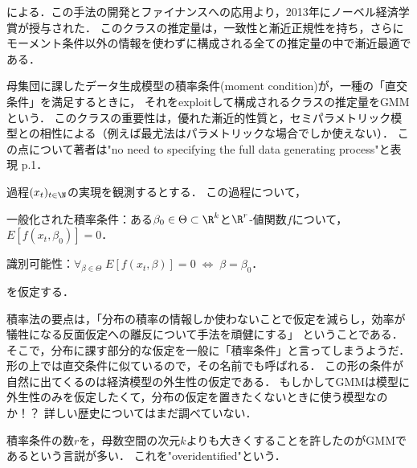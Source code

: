 \documentclass[uplatex,dvipdfmx]{jsreport}
\begin{document}
\begin{tcolorbox}[colframe=ForestGreen, colback=ForestGreen!10!white,breakable,colbacktitle=ForestGreen!40!white,coltitle=black,fonttitle=\bfseries\sffamily,
title=Generalized Method of Moments]
    \cite{Hansen82-GMMr}による．この手法の開発とファイナンスへの応用より，2013年にノーベル経済学賞が授与された．
    このクラスの推定量は，一致性と漸近正規性を持ち，さらにモーメント条件以外の情報を使わずに構成される全ての推定量の中で漸近最適である．
\end{tcolorbox}

\begin{remarks}
    母集団に課したデータ生成模型の積率条件(moment condition)が，一種の「直交条件」を満足するときに，
    それをexploitして構成されるクラスの推定量をGMMという\cite{Hansen07-GMM}．
    このクラスの重要性は，優れた漸近的性質と，セミパラメトリック模型との相性による（例えば最尤法はパラメトリックな場合でしか使えない）．
    この点について著者は"no need to specifying the full data generating process"と表現\cite{Hansen07-GMM} p.1．
\end{remarks}

\begin{model}
    過程$(x_t)_{t\in\N}$の実現を観測するとする．
    この過程について，
    \begin{enumerate}[{[A}1{]}]
        \item 一般化された積率条件：ある$\beta_0\in\Theta\subset\R^k$と$\R^r$-値関数$f$について，$E[f(x_t,\beta_0)]=0$．
        \item 識別可能性：$\forall_{\beta\in\Theta}\;E[f(x_t,\beta)]=0\;\Leftrightarrow\;\beta=\beta_0$．
    \end{enumerate}
    を仮定する．
\end{model}
\begin{history}
    積率法の要点は，「分布の積率の情報しか使わないことで仮定を減らし，効率が犠牲になる反面仮定への離反について手法を頑健にする」
    ということである．そこで，分布に課す部分的な仮定を一般に「積率条件」と言ってしまうようだ．
    形の上では直交条件に似ているので，その名前でも呼ばれる．
    この形の条件が自然に出てくるのは経済模型の外生性の仮定である．
    もしかしてGMMは模型に外生性のみを仮定したくて，分布の仮定を置きたくないときに使う模型なのか！？
    詳しい歴史についてはまだ調べていない．
\end{history}
\begin{remark}
    積率条件の数$r$を，母数空間の次元$k$よりも大きくすることを許したのがGMMであるという言説が多い．
    これを"overidentified"という．
\end{remark}
\end{document}

